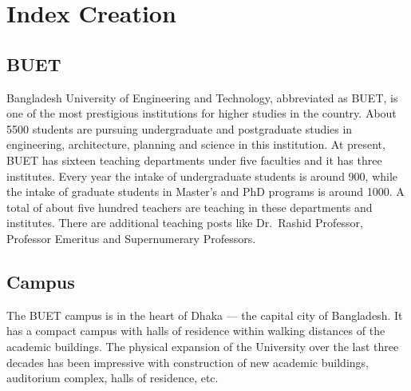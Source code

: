 \chapter{Index Creation}
\section{BUET}
Bangladesh University of Engineering and Technology, abbreviated as
BUET, is one of the most prestigious institutions for
higher studies in the country. About 5500 students are pursuing
undergraduate and
postgraduate studies in engineering,
architecture, planning and science in this institution. At present,
BUET has sixteen teaching departments under five faculties and it has
three institutes. Every year the intake of undergraduate students is
around 900, while the intake of graduate students in Master's and PhD
programs is around 1000. A total of about five hundred teachers are
teaching in these departments and institutes. There are additional
teaching posts like Dr.\ Rashid Professor, Professor Emeritus and
Supernumerary Professors.
 
\section{Campus}
The BUET campus is in the heart of Dhaka --- the capital
city of Bangladesh. It has a compact campus with halls of residence
within walking distances of the academic buildings. The physical
expansion of the University over the last three decades has been
impressive with construction of new academic buildings,
auditorium complex, halls of residence, etc.
 
